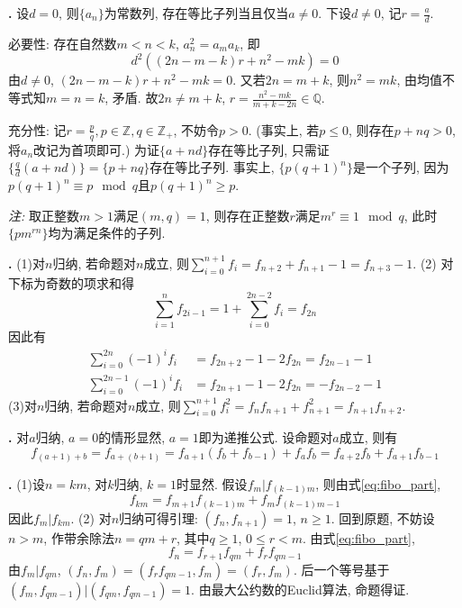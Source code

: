 \par \textbf{\thesolseq .} 设$d=0$, 则$\{a_n\}$为常数列, 存在等比子列当且仅当$a\neq 0$. 下设$d\neq 0$, 记$r=\frac{a}{d}$.
\par 必要性: 存在自然数$m<n<k$, $a_n^2=a_ma_k$, 即
\begin{equation*}
    d^2((2n-m-k)r+n^2-mk)=0
\end{equation*}
由$d\neq 0$, $(2n-m-k)r+n^2-mk=0$. 又若$2n=m+k$, 则$n^2=mk$, 由均值不等式知$m=n=k$, 矛盾. 故$2n\neq m+k$, $r=\frac{n^2-mk}{m+k-2n}\in\mathbb{Q}$. 
\par 充分性: 记$r=\frac{p}{q}, p\in \mathbb{Z}, q\in \mathbb{Z}_+$, 不妨令$p>0$. (事实上, 若$p\le 0$, 则存在$p+nq>0$, 将$a_n$改记为首项即可.) 为证$\{a+nd\}$存在等比子列, 只需证$\{\frac{q}{d}(a+nd)\}=\{p+nq\}$存在等比子列. 事实上, $\{p(q+1)^n\}$是一个子列, 因为$p(q+1)^n\equiv p\mod q$且$p(q+1)^n\ge p$.
\par \emph{注:} 取正整数$m>1$满足$(m,q)=1$, 则存在正整数$r$满足$m^r\equiv 1 \mod q$, 此时$\{pm^{rn}\}$均为满足条件的子列. 

\par \textbf{\thesolseq .} (1)对$n$归纳, 若命题对$n$成立, 则$\sum_{i=0}^{n+1} f_i = f_{n+2}+f_{n+1}-1=f_{n+3}-1$. (2) 对下标为奇数的项求和得
\begin{equation}
    \sum_{i=1}^n f_{2i-1} = 1+\sum_{i=0}^{2n-2} f_i = f_{2n}
\end{equation}
因此有
\begin{align*}
    \sum_{i=0}^{2n} (-1)^i f_i & = f_{2n+2} - 1 - 2f_{2n} = f_{2n-1}-1\\
    \sum_{i=0}^{2n-1} (-1)^i f_i & = f_{2n+1} - 1 - 2f_{2n} = -f_{2n-2}-1
\end{align*}
(3)对$n$归纳, 若命题对$n$成立, 则$\sum_{i=0}^{n+1} f^2_i = f_nf_{n+1}+f_{n+1}^2=f_{n+1}f_{n+2}$.

\par \textbf{\thesolseq .} 对$a$归纳, $a=0$的情形显然, $a=1$即为递推公式. 设命题对$a$成立, 则有
\begin{equation*}
    f_{(a+1)+b}=f_{a+(b+1)}=f_{a+1}(f_{b}+f_{b-1})+f_af_b = f_{a+2}f_b+f_{a+1}f_{b-1}
\end{equation*}

\par \textbf{\thesolseq .} (1)设$n=km$, 对$k$归纳, $k=1$时显然. 假设$f_m|f_{(k-1)m}$, 则由式\ref{eq:fibo_part},
\begin{equation*}
    f_{km} = f_{m+1}f_{(k-1)m}+f_m f_{(k-1)m-1}
\end{equation*}
因此$f_m|f_{km}$. (2) 对$n$归纳可得引理: $(f_n,f_{n+1})=1$, $n\ge 1$. 回到原题, 不妨设$n>m$, 作带余除法$n=qm+r$, 其中$q\ge 1$, $0\le r<m$. 由式\ref{eq:fibo_part},
\begin{equation*}
    f_{n} = f_{r+1}f_{qm} + f_{r}f_{qm-1}
\end{equation*}
由$f_m|f_{qm}$, $(f_n,f_m)=(f_rf_{qm-1}, f_m)=(f_r,f_m)$. 后一个等号基于$(f_{m}, f_{qm-1}) | (f_{qm}, f_{qm-1})=1$. 由最大公约数的Euclid算法, 命题得证. 

